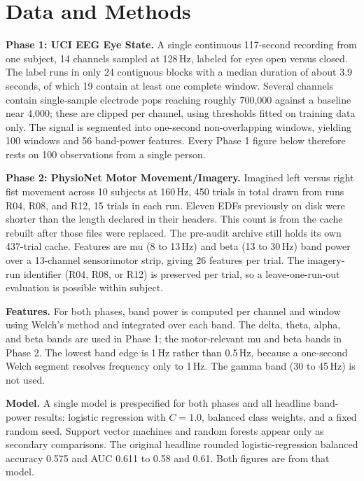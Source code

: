 \documentclass[11pt]{article}
\begin{document}
\section{Data and Methods}
\textbf{Phase 1: UCI EEG Eye State.} A single continuous 117-second recording from one subject, 14 channels sampled at 128\,Hz, labeled for eyes open versus closed. The label runs in only 24 contiguous blocks with a median duration of about 3.9 seconds, of which 19 contain at least one complete window. Several channels contain single-sample electrode pops reaching roughly 700{,}000 against a baseline near 4{,}000; these are clipped per channel, using thresholds fitted on training data only. The signal is segmented into one-second non-overlapping windows, yielding 100 windows and 56 band-power features. Every Phase 1 figure below therefore rests on 100 observations from a single person.

\textbf{Phase 2: PhysioNet Motor Movement/Imagery.} Imagined left versus right fist movement across 10 subjects at 160\,Hz, 450 trials in total drawn from runs R04, R08, and R12, 15 trials in each run. Eleven EDFs previously on disk were shorter than the length declared in their headers. This count is from the cache rebuilt after those files were replaced. The pre-audit archive still holds its own 437-trial cache. Features are mu (8 to 13\,Hz) and beta (13 to 30\,Hz) band power over a 13-channel sensorimotor strip, giving 26 features per trial. The imagery-run identifier (R04, R08, or R12) is preserved per trial, so a leave-one-run-out evaluation is possible within subject.

\textbf{Features.} For both phases, band power is computed per channel and window using Welch's method and integrated over each band. The delta, theta, alpha, and beta bands are used in Phase 1; the motor-relevant mu and beta bands in Phase 2. The lowest band edge is 1\,Hz rather than 0.5\,Hz, because a one-second Welch segment resolves frequency only to 1\,Hz. The gamma band (30 to 45\,Hz) is not used.

\textbf{Model.} A single model is prespecified for both phases and all headline band-power results: logistic regression with $C = 1.0$, balanced class weights, and a fixed random seed. Support vector machines and random forests appear only as secondary comparisons. The original headline rounded logistic-regression balanced accuracy 0.575 and AUC 0.611 to 0.58 and 0.61. Both figures are from that model.
\end{document}
